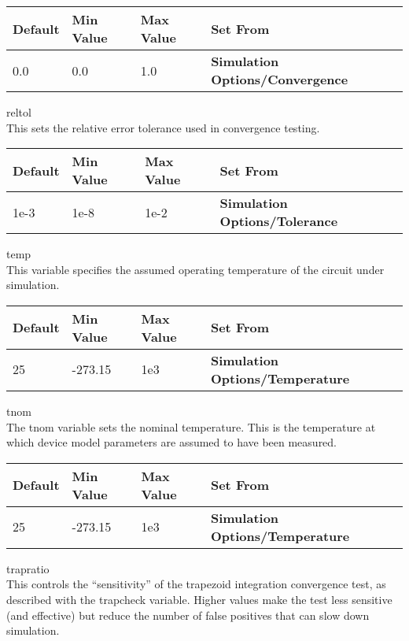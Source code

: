 \begin{description}
\begin{tabular}{|l|l|l|l|}\hline
\bf Default & \bf Min Value & \bf Max Value & \bf Set From\\ \hline
0.0 & 0.0 & 1.0 & \bf Simulation Options/Convergence\\ \hline
\end{tabular}

\item{\et reltol}\\
This sets the relative error tolerance used in convergence testing. 

\begin{tabular}{|l|l|l|l|}\hline
\bf Default & \bf Min Value & \bf Max Value & \bf Set From\\ \hline
1e-3 & 1e-8 & 1e-2 & \bf Simulation Options/Tolerance\\ \hline
\end{tabular}

\item{\et temp}\\
This variable specifies the assumed operating temperature of the
circuit under simulation.

\begin{tabular}{|l|l|l|l|}\hline
\bf Default & \bf Min Value & \bf Max Value & \bf Set From\\ \hline
25 & -273.15 & 1e3 & \bf Simulation Options/Temperature\\ \hline
\end{tabular}
 
\item{\et tnom}\\
The {\et tnom} variable sets the nominal temperature.  This is the
temperature at which device model parameters are assumed to have been
measured.

\begin{tabular}{|l|l|l|l|}\hline
\bf Default & \bf Min Value & \bf Max Value & \bf Set From\\ \hline
25 & -273.15 & 1e3 & \bf Simulation Options/Temperature\\ \hline
\end{tabular}

\item{\et trapratio}\\
This controls the ``sensitivity'' of the trapezoid integration
convergence test, as described with the {\et trapcheck} variable. 
Higher values make the test less sensitive (and effective) but reduce
the number of false positives that can slow down simulation.


\end{description}
